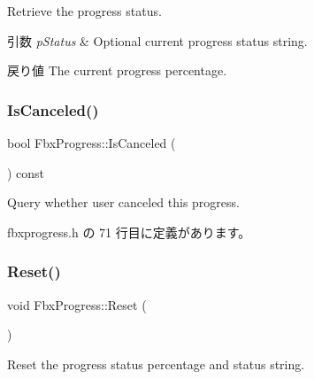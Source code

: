 Retrieve the progress status. 
\begin{DoxyParams}{引数}
{\em p\+Status} & Optional current progress status string. \\
\hline
\end{DoxyParams}
\begin{DoxyReturn}{戻り値}
The current progress percentage. 
\end{DoxyReturn}
\mbox{\label{class_fbx_progress_a01a1707ca7bdb12250642661ac1a3a31}} 
\subsubsection{\texorpdfstring{Is\+Canceled()}{IsCanceled()}}
{\footnotesize\ttfamily bool Fbx\+Progress\+::\+Is\+Canceled (\begin{DoxyParamCaption}{ }\end{DoxyParamCaption}) const\hspace{0.3cm}{\ttfamily [inline]}}



Query whether user canceled this progress. 



 fbxprogress.\+h の 71 行目に定義があります。

\mbox{\label{class_fbx_progress_a5f7149e7ac9e7dd29eae9f3ebada5418}} 
\subsubsection{\texorpdfstring{Reset()}{Reset()}}
{\footnotesize\ttfamily void Fbx\+Progress\+::\+Reset (\begin{DoxyParamCaption}{ }\end{DoxyParamCaption})}



Reset the progress status percentage and status string. 

\mbox{\label{class_fbx_progress_a8d165798c9c75bdf2498d7a6840220aa}} 

